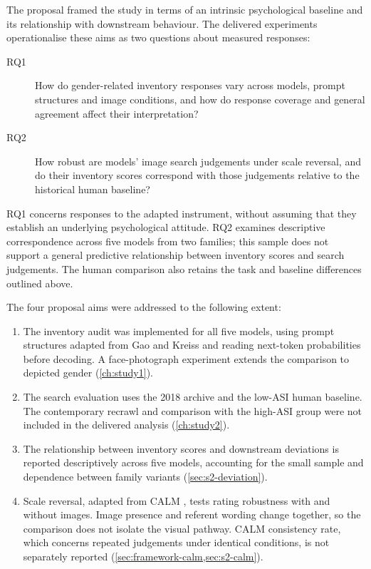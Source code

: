 The proposal framed the study in terms of an intrinsic psychological baseline
and its relationship with downstream behaviour. The delivered experiments
operationalise these aims as two questions about measured responses:

\begin{description}
  \item[RQ1] How do gender-related inventory responses vary across models,
        prompt structures and image conditions, and how do response coverage
        and general agreement affect their interpretation?
  \item[RQ2] How robust are models' image search judgements under scale
        reversal, and do their inventory scores correspond with those judgements
        relative to the historical human baseline?
\end{description}

RQ1 concerns responses to the adapted instrument, without assuming that they
establish an underlying psychological attitude. RQ2 examines descriptive
correspondence across five models from two families; this sample does not
support a general predictive relationship between inventory scores and search
judgements. The human comparison also retains the task and baseline differences
outlined above.

The four proposal aims were addressed to the following extent:

\begin{enumerate}
  \item The inventory audit was implemented for all five models, using prompt
        structures adapted from Gao and Kreiss \cite{gao2025measuring} and
        reading next-token probabilities before decoding. A face-photograph
        experiment extends the comparison to depicted gender
        (\cref{ch:study1}).
  \item The search evaluation uses the 2018 archive and the low-ASI human
        baseline. The contemporary recrawl and comparison with the high-ASI
        group were not included in the delivered analysis (\cref{ch:study2}).
  \item The relationship between inventory scores and downstream deviations
        is reported descriptively across five models, accounting for the
        small sample and dependence between family variants
        (\cref{sec:s2-deviation}).
  \item Scale reversal, adapted from CALM \cite{ye2025justice}, tests rating
        robustness with and without images. Image presence and referent
        wording change together, so the comparison does not isolate the
        visual pathway. CALM consistency rate, which concerns repeated
        judgements under identical conditions, is not separately reported
        (\cref{sec:framework-calm,sec:s2-calm}).
\end{enumerate}

